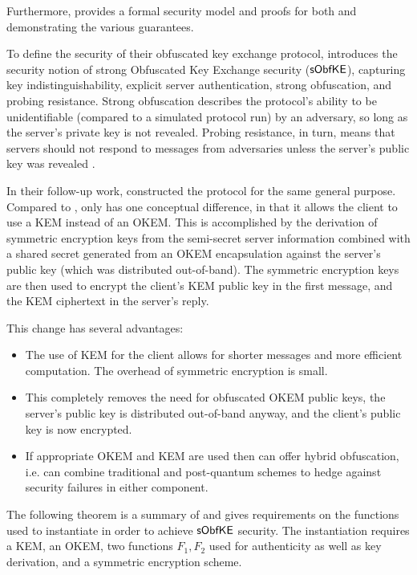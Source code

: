 Furthermore, \cite{CCS:GunSteVei24} provides a formal security model and proofs for both \obfsfour{} and \pqobfs{} demonstrating the various guarantees.

To define the security of their obfuscated key exchange protocol, \cite{CCS:GunSteVei24} introduces the security notion of strong Obfuscated Key Exchange security ($\mathsf{sObfKE}$), capturing key indistinguishability, explicit server authentication, strong obfuscation, and probing resistance. Strong obfuscation describes the protocol's ability to be unidentifiable (compared to a simulated protocol run) by an adversary, so long as the server's private key is not revealed. Probing resistance, in turn, means that servers should not respond to messages from adversaries unless the server's public key was revealed \cite[Section~4.1]{CCS:GunSteVei24}.

In their follow-up work, \cite{EPRINT:GRSV25} constructed the \drivel{} protocol for the same general purpose. Compared to \pqobfs{}, \drivel{} only has one conceptual difference, in that it allows the client to use a KEM instead of an OKEM.
This is accomplished by the derivation of symmetric encryption keys from the semi-secret server information combined with a shared secret generated from an OKEM encapsulation against the server's public key (which was distributed out-of-band).
The symmetric encryption keys are then used to encrypt the client's KEM public key in the first message, and the KEM ciphertext in the server's reply.

This change has several advantages:
\begin{itemize}
    \item The use of KEM for the client allows for shorter messages and more efficient computation. The overhead of symmetric encryption is small.
    \item This completely removes the need for obfuscated OKEM public keys, the server's public key is distributed out-of-band anyway, and the client's public key is now encrypted.
    \item If appropriate OKEM and KEM are used then \drivel{} can offer hybrid obfuscation, i.e. \drivel{} can combine traditional and post-quantum schemes to hedge against security failures in either component.
\end{itemize}

The following theorem is a summary of \cite[Theorem~5]{EPRINT:GRSV25} and gives requirements on the functions used to instantiate \drivel{} in order to achieve $\mathsf{sObfKE}$ security. The instantiation requires a KEM, an OKEM, two functions $F_1, F_2$ used for authenticity as well as key derivation, and a symmetric encryption scheme.

